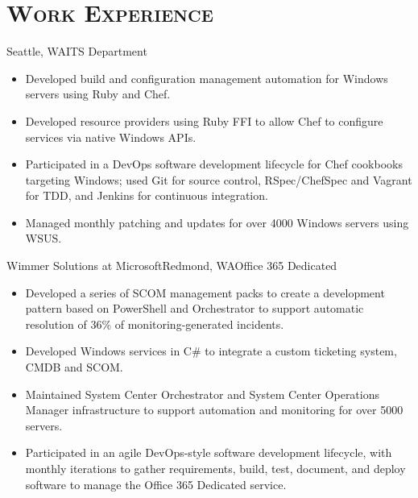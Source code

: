\documentclass[11pt,letter,roman]{moderncv}
\begin{document}
\section{\textsc{Work Experience}}
{Seattle, WA}{ITS Department}{%
  \begin{itemize}
    \item Developed build and configuration management automation for Windows
      servers using Ruby and Chef.
    \item Developed resource providers using Ruby FFI to allow Chef to
      configure services via native Windows APIs.
    \item Participated in a DevOps software development lifecycle for Chef
      cookbooks targeting Windows; used Git for source control, RSpec/ChefSpec
      and Vagrant for TDD, and Jenkins for continuous integration.
    \item Managed monthly patching and updates for over 4000 Windows servers
      using WSUS.
  \end{itemize}
}
{Wimmer Solutions at Microsoft}{Redmond, WA}{Office 365 Dedicated}{%
  \begin{itemize}
    \item Developed a series of SCOM management packs to create a development
      pattern based on PowerShell and Orchestrator to support automatic
      resolution of 36\% of monitoring-generated incidents.
    \item Developed Windows services in C\# to integrate a custom ticketing
      system, CMDB and SCOM.
    \item Maintained System Center Orchestrator and System Center Operations
      Manager infrastructure to support automation and monitoring for over 5000
      servers.
    \item Participated in an agile DevOps-style software development lifecycle,
      with monthly iterations to gather requirements, build, test, document,
      and deploy software to manage the Office 365 Dedicated service.
  \end{itemize}
}
\end{document}
